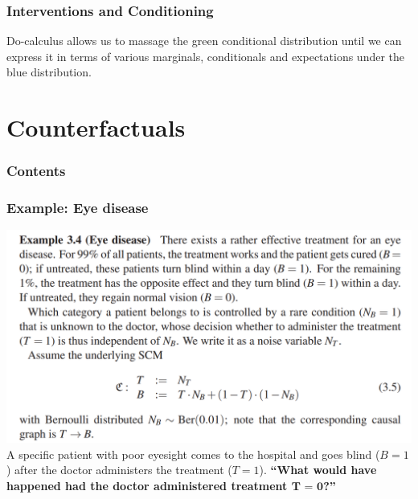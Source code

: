 \documentclass{beamer}
\begin{document}
\begin{frame}
    \frametitle{Interventions and Conditioning} 
    Do-calculus allows us to massage the green conditional distribution 
    until we can express it in terms of various marginals, conditionals and expectations under the blue distribution. \\
\end{frame}

\section{Counterfactuals}

\begin{frame}
    \frametitle{Contents}
    \tableofcontents[currentsection]
\end{frame}

\begin{frame}
    \frametitle{Example: Eye disease} 
    \includegraphics[scale=0.6]{fig13.png} \\
    A specific patient with poor eyesight comes to the hospital and goes blind ($B=1$) after the doctor administers 
    the treatment ($T=1$). \textbf{“What would have happened had the doctor administered treatment $\textbf{T = 0}$?”}
\end{frame}
\end{document}
